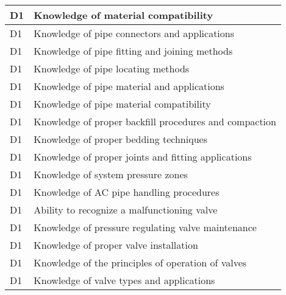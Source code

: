 \begin{table}[H]
\begin{tabular}{| m{1cm} |m{15cm} |}
D1 & Knowledge of material   compatibility                                                                          \\ \hline
D1 & Knowledge of pipe   connectors and applications                                                                \\ \hline
D1 & Knowledge of pipe   fitting and joining methods                                                                \\ \hline
D1 & Knowledge of pipe   locating methods                                                                           \\ \hline
D1 & Knowledge of pipe   material and applications                                                                  \\ \hline
D1 & Knowledge of pipe   material compatibility                                                                     \\ \hline
D1 & Knowledge of proper   backfill procedures and compaction                                                       \\ \hline
D1 & Knowledge of proper   bedding techniques                                                                       \\ \hline
D1 & Knowledge of proper   joints and fitting applications                                                          \\ \hline
D1 & Knowledge of system   pressure zones                                                                           \\ \hline
D1 & Knowledge of AC pipe   handling procedures                                                                     \\ \hline
D1 & Ability to recognize   a malfunctioning valve                                                                  \\ \hline
D1 & Knowledge of pressure   regulating valve maintenance                                                           \\ \hline
D1 & Knowledge of proper   valve installation                                                                       \\ \hline
D1 & Knowledge of the   principles of operation of valves                                                           \\ \hline
D1 & Knowledge of valve   types and applications                                                                    \\ \hline

\end{tabular}
\end{table}
